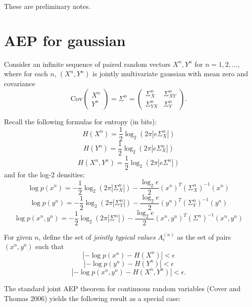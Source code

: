 \documentclass[12pt]{article}
\begin{document}
\maketitle

\newcommand{\tr}{\text{tr}}
\newcommand{\E}{\textbf{E}}
\newcommand{\diag}{\text{diag}}
\newcommand{\argmax}{\text{argmax}}
\newcommand{\Cov}{\text{Cov}}
\newcommand{\Var}{\text{Var}}
\newcommand{\argmin}{\text{argmin}}
\newcommand{\Vol}{\text{Vol}}
\newcommand{\comm}[1]{}

These are preliminary notes.

\section{AEP for gaussian}

Consider an infinite sequence of paired random vectors $X^n, Y^n$ for $n = 1,2, \hdots$,
where for each $n$, 
$(X^n, Y^n)$ is jointly multivariate gaussian with mean zero and covariance
\[
\Cov\begin{pmatrix}X^n\\Y^n\end{pmatrix} = \Sigma^n = \begin{pmatrix}
\Sigma_X^n & \Sigma_{XY}^n\\
\Sigma_{YX}^n & \Sigma_Y^n
\end{pmatrix}.
\]

Recall the following formulas for entropy (in bits):
\[
H(X^n) = \frac{1}{2}\log_2(2\pi|e\Sigma_X^n|)
\]
\[
H(Y^n) = \frac{1}{2}\log_2(2\pi|e\Sigma_X^n|)
\]
\[
H(X^n, Y^n) = \frac{1}{2}\log_2(2\pi|e\Sigma^n|)
\]
and for the log-2 densities:
\[
\log p(x^n) = -\frac{1}{2}\log_2(2\pi|\Sigma_X^n|) - \frac{\log_2 e}{2} (x^n)^T(\Sigma_X^n)^{-1} (x^n)
\]
\[
\log p(y^n) = -\frac{1}{2}\log_2(2\pi|\Sigma_Y^n|) - \frac{\log_2 e}{2} (y^n)^T(\Sigma_Y^n)^{-1} (y^n)
\]
\[
\log p(x^n, y^n) = -\frac{1}{2}\log_2(2\pi|\Sigma^n|) - \frac{\log_2 e}{2} (x^n, y^n)^T(\Sigma^n)^{-1} (x^n, y^n)
\]


For given $n$, define the set of \emph{jointly typical values} $A^{(n)}_\epsilon$ as the set of pairs $(x^n, y^n)$ such that
\[
\left|-\log p(x^n) - H(X^n)\right| < \epsilon
\]
\[
\left|-\log p(y^n) - H(Y^n)\right| < \epsilon
\]
\[
\left|-\log p(x^n, y^n) - H(X^n, Y^n)\right| < \epsilon.
\]

The standard joint AEP theorem for continuous random variables (Cover and Thomas 2006) yields the following result as a special case:
\end{document}
